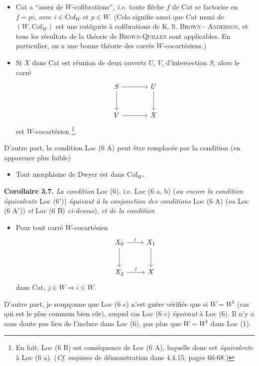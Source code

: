\documentclass[11pt]{article}
\newcommand{\printedpage}[1]{\marginpar{\footnotesize p.~#1}}
\newcommand{\msp}[1]{\marginpar{\footnotesize [#1]}}
\newcommand{\Cof}{\mathrm{Cof}}
\begin{document}
\printedpage{18}
\begin{itemize}[leftmargin=7em, labelwidth=6em]
\item[\textbf{Loc (6 A)}] Cat a “assez de $W$-cofibrations”,
\msp{page 26}\textit{i.e.} toute flèche $f$ de Cat se factorise en $f = pi$, avec $i \in \Cof_W$ et $p \in W$. (Cela signifie aussi que Cat muni de $(W, \Cof_W)$ est une catégorie à cofibrations de K. S. \textsc{Brown} - \textsc{Anderson}, et tous les résultats de la théorie de \textsc{Brown-Quillen} sont applicables. En particulier, on a une bonne théorie des carrés $W$-cocartésiens.)
\item[\textbf{Loc (6 B)}] Si $X$ dans Cat est réunion de deux ouverts $U$, $V$, d'intersection $S$, alors le carré
\[
\begin{tikzcd}[ampersand replacement=\&, row sep=large, column sep=large]
S \arrow[r] \arrow[d] \& U \arrow[d] \\
V \arrow[r] \& X
\end{tikzcd}
\]
est $W$-cocartésien \footnote[19]{En fait, Loc (6 B) est conséquence de Loc (6 A), laquelle donc est \textit{équivalente} à Loc (6 a). (\textit{Cf.} esquisse de démonstration dans 4.4.15, pages 66-68.)}.
\end{itemize}
D'autre part, la condition Loc (6 A) peut être remplacée par la condition (en apparence plus faible)
\begin{itemize}[leftmargin=7em, labelwidth=6em]
\item[\textbf{Loc (6 A$'$)}] Tout morphisme de Dwyer est dans $\Cof_W$.
\end{itemize}
\textbf{Corollaire 3.7.} \textit{La condition} Loc (6), i.e. Loc (6 a, b) (\textit{ou encore la condition équivalente} Loc (6$'$)) \textit{équivaut à la conjonction des conditions} Loc (6 A) (\textit{ou} Loc (6 A$'$)) \textit{et} Loc (6 B) \textit{ci-dessus}), \textit{et de la condition}
\begin{itemize}[leftmargin=7em, labelwidth=6em]
\item[\textbf{Loc (6 C)}] Pour tout carré $W$-cocartésien
\[
\begin{tikzcd}[ampersand replacement=\&, row sep=large]
X_0 \arrow[r, "i"] \arrow[d] \& X_1 \arrow[d] \\
X_2 \arrow[r, "j"] \& X
\end{tikzcd}
\]
dans Cat, $j \in W \Longrightarrow i \in W$.
\end{itemize}
\msp{page 27}D'autre part, je soupçonne que Loc (6 c) n'est guère vérifiée que si $W = W^{\natural}$ (cas qui est le plus commun bien sûr), auquel cas Loc (6 c) \textit{équivaut} à Loc (6). Il n'y a sans doute pas lieu de l'inclure dans Loc (6), pas plus que $W = W^{\natural}$ dans Loc (1).
\end{document}
